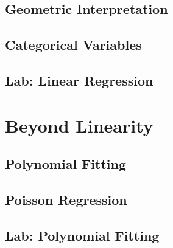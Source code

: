         \subsection{Geometric Interpretation}
        \subsection{Categorical Variables}
        \subsection{Lab: Linear Regression}
        
    \section{Beyond Linearity}
        \subsection{Polynomial Fitting}
        \subsection{Poisson Regression}
        \subsection{Lab: Polynomial Fitting}